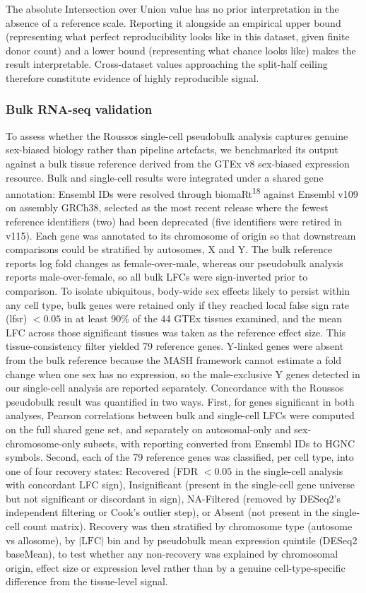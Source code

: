 \documentclass[
]{article}
\begin{document}
The absolute Intersection over Union value has no prior interpretation
in the absence of a reference scale. Reporting it alongside an empirical
upper bound (representing what perfect reproducibility looks like in
this dataset, given finite donor count) and a lower bound (representing
what chance looks like) makes the result interpretable. Cross-dataset
values approaching the split-half ceiling therefore constitute evidence
of highly reproducible signal.

\subsubsection{Bulk RNA-seq validation}\label{bulk-rna-seq-validation}

To assess whether the Roussos single-cell pseudobulk analysis captures
genuine sex-biased biology rather than pipeline artefacts, we
benchmarked its output against a bulk tissue reference derived from the
GTEx v8 sex-biased expression resource. Bulk and single-cell results
were integrated under a shared gene annotation: Ensembl IDs were
resolved through biomaRt\textsuperscript{18} against Ensembl v109 on
assembly GRCh38, selected as the most recent release where the fewest
reference identifiers (two) had been deprecated (five identifiers were
retired in v115). Each gene was annotated to its chromosome of origin so
that downstream comparisons could be stratified by autosomes, X and Y.
The bulk reference reports log fold changes as female-over-male, whereas
our pseudobulk analysis reports male-over-female, so all bulk LFCs were
sign-inverted prior to comparison. To isolate ubiquitous, body-wide sex
effects likely to persist within any cell type, bulk genes were retained
only if they reached local false sign rate (lfsr) \(< 0.05\) in at least
90\% of the 44 GTEx tissues examined, and the mean LFC across those
significant tissues was taken as the reference effect size. This
tissue-consistency filter yielded 79 reference genes. Y-linked genes
were absent from the bulk reference because the MASH framework cannot
estimate a fold change when one sex has no expression, so the
male-exclusive Y genes detected in our single-cell analysis are reported
separately. Concordance with the Roussos pseudobulk result was
quantified in two ways. First, for genes significant in both analyses,
Pearson correlations between bulk and single-cell LFCs were computed on
the full shared gene set, and separately on autosomal-only and
sex-chromosome-only subsets, with reporting converted from Ensembl IDs
to HGNC symbols. Second, each of the 79 reference genes was classified,
per cell type, into one of four recovery states: Recovered (FDR
\(< 0.05\) in the single-cell analysis with concordant LFC sign),
Insignificant (present in the single-cell gene universe but not
significant or discordant in sign), NA-Filtered (removed by DESeq2's
independent filtering or Cook's outlier step), or Absent (not present in
the single-cell count matrix). Recovery was then stratified by
chromosome type (autosome vs allosome), by \(|\text{LFC}|\) bin and by
pseudobulk mean expression quintile (DESeq2 baseMean), to test whether
any non-recovery was explained by chromosomal origin, effect size or
expression level rather than by a genuine cell-type-specific difference
from the tissue-level signal.
\end{document}
